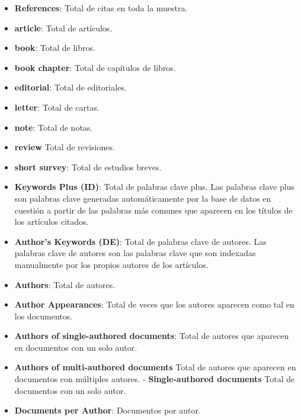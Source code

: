 \documentclass[
]{article}
\providecommand{\tightlist}{%
  \setlength{\itemsep}{0pt}\setlength{\parskip}{0pt}}
\begin{document}
\begin{itemize}
\tightlist
\item
  \textbf{References}: Total de citas en toda la muestra.\\
\item
  \textbf{article}: Total de artículos.\\
\item
  \textbf{book}: Total de libros.\\
\item
  \textbf{book chapter}: Total de capítulos de libros.\\
\item
  \textbf{editorial}: Total de editoriales.\\
\item
  \textbf{letter}: Total de cartas.
\item
  \textbf{note}: Total de notas.\\
\item
  \textbf{review} Total de revisiones.\\
\item
  \textbf{short survey}: Total de estudios breves.\\
\item
  \textbf{Keywords Plus (ID)}: Total de palabras clave plus. Las
  palabras clave plus son palabras clave generadas automáticamente por
  la base de datos en cuestión a partir de las palabras más comunes que
  aparecen en los títulos de los artículos citados.
\item
  \textbf{Author's Keywords (DE)}: Total de palabras clave de autores.
  Las palabras clave de autores son las palabras clave que son indexadas
  manualmente por los propios autores de los artículos.
\item
  \textbf{Authors}: Total de autores.\\
\item
  \textbf{Author Appearances}: Total de veces que los autores aparecen
  como tal en los documentos.\\
\item
  \textbf{Authors of single-authored documents}: Total de autores que
  aparecen en documentos con un solo autor.
\item
  \textbf{Authors of multi-authored documents} Total de autores que
  aparecen en documentos con múltiples autores. -
  \textbf{Single-authored documents} Total de documentos con un solo
  autor.\\
\item
  \textbf{Documents per Author}: Documentos por autor.
\end{itemize}
\end{document}
